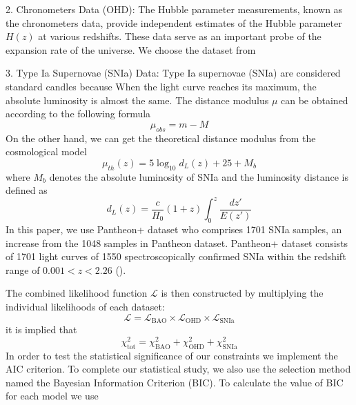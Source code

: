\documentclass[preprint]{aastex631}
\begin{document}
2. Chronometers Data (OHD): The Hubble parameter measurements, known as the chronometers data, provide independent estimates of the Hubble parameter \(H(z)\) at various redshifts. These data serve as an important probe of the expansion rate of the universe. We choose the dataset from \cite{Favale_2023}

3. Type Ia Supernovae (SNIa) Data: Type Ia supernovae (SNIa) are considered standard candles because When the light curve reaches its maximum, the absolute luminosity is almost the same. The distance modulus $\mu$ can be obtained according to the following formula
\begin{equation}
    \mu_{obs}=m-M
\end{equation}
On the other hand, we can get the theoretical distance modulus from the cosmological model
\begin{equation}
    \mu_{th}(z)=5\log_{10}d_L(z)+25+M_b
\end{equation}
where $M_b$ denotes the absolute luminosity of SNIa and the luminosity distance is defined as
\begin{equation}
    d_L(z)=\frac{c}{H_0}(1+z)\int_0^z \frac{dz'}{E(z')}
\end{equation}
In this paper, we use Pantheon+ dataset who comprises 1701 SNIa samples, an increase from the 1048 samples in Pantheon dataset. Pantheon+ dataset consists of 1701 light curves of 1550 spectroscopically confirmed SNIa within the redshift range of $0.001 < z < 2.26$ (\cite{Scolnic_2022,Brout_2022}).

The combined likelihood function \(\mathcal{L}\) is then constructed by multiplying the individual likelihoods of each dataset:
\begin{equation}
\mathcal{L} = \mathcal{L}_{\text{BAO}} \times \mathcal{L}_{\text{OHD}} \times \mathcal{L}_{\text{SNIa}}
\end{equation}
it is implied that
\begin{equation}
    \chi^2_\text{tot}=\chi^2_{\text{BAO}}+\chi^2_{\text{OHD}} +\chi^2_{\text{SNIa}}
\end{equation}
In order to test the statistical significance of our constraints we implement the AIC criterion.
To complete our statistical study, we also use the selection method named the Bayesian Information Criterion (BIC). To calculate the value of BIC for each model we use
\end{document}
